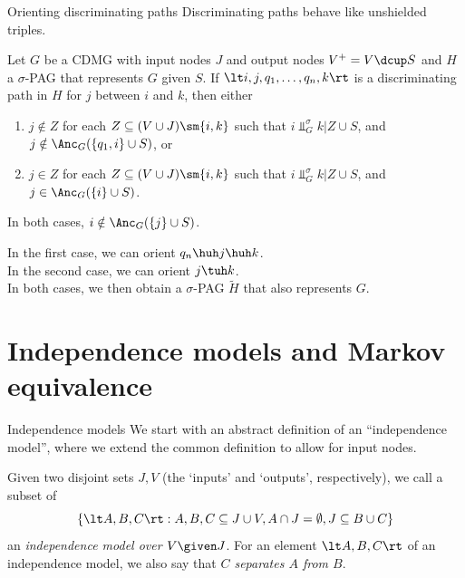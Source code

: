 \begin{frame}{Orienting discriminating paths}
Discriminating paths behave like unshielded triples. 

  \medskip
\begin{Prp}[\ref{prp:orienting_discriminating_paths}]
  Let $G$ be a CDMG with input nodes $J$ and output nodes $V^+ = V \dcup S$ and $H$ a $\sigma$-PAG that represents $G$ given $S$.
  If $\lt i, j, q_1, \dots, q_n, k \rt$ is a discriminating path in $H$ for $j$ between $i$ and $k$, then
  either 
  \begin{enumerate}
    \item $j \notin Z$ for each $Z \subseteq (V \cup J) \sm \{i,k\}$ such that $i \Perp^\sigma_G k | Z \cup S$, and $j \notin \Anc_G(\{q_1,i\} \cup S)$, or
    \item $j \in Z$ for each $Z \subseteq (V \cup J) \sm \{i,k\}$ such that $i \Perp^\sigma_G k | Z \cup S$, and $j \in \Anc_G(\{i\} \cup S)$.
  \end{enumerate}
  In both cases, $i \notin \Anc_G(\{j\} \cup S)$.
\end{Prp}

  \medskip
  In the first case, we can orient $q_n \huh j \huh k$.\\
  In the second case, we can orient $j \tuh k$.\\
  In both cases, we then obtain a $\sigma$-PAG $\tilde{H}$ that also represents $G$. 
\end{frame}


\section{Independence models and Markov equivalence}
\frame{\sectionpage}

\begin{frame}{Independence models}
We start with an abstract definition of an ``independence model'', where we extend the common definition to allow for input nodes.
\begin{Def}[\ref{def:independence_model}]
  Given two disjoint sets $J,V$ (the `inputs' and `outputs', respectively), we call a subset of 
  $$\{ \lt A, B, C \rt : A, B, C \subseteq J \cup V, A \cap J = \emptyset, J \subseteq B \cup C  \}$$
  an \emph{independence model over $V \given J$}.
  For an element $\lt A, B, C \rt$ of an independence model, we also say that \emph{$C$ separates $A$ from $B$}.
\end{Def}
\end{frame}

